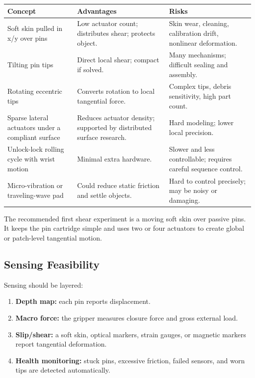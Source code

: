 \documentclass[11pt]{article}
\begin{document}
\begin{longtable}{L{0.22\textwidth} L{0.33\textwidth} L{0.33\textwidth}}
\toprule
\textbf{Concept} & \textbf{Advantages} & \textbf{Risks} \\
\midrule
\endhead
Soft skin pulled in x/y over pins & Low actuator count; distributes shear; protects object. & Skin wear, cleaning, calibration drift, nonlinear deformation. \\
Tilting pin tips & Direct local shear; compact if solved. & Many mechanisms; difficult sealing and assembly. \\
Rotating eccentric tips & Converts rotation to local tangential force. & Complex tips, debris sensitivity, high part count. \\
Sparse lateral actuators under a compliant surface & Reduces actuator density; supported by distributed surface research. & Hard modeling; lower local precision. \\
Unlock-lock rolling cycle with wrist motion & Minimal extra hardware. & Slower and less controllable; requires careful sequence control. \\
Micro-vibration or traveling-wave pad & Could reduce static friction and settle objects. & Hard to control precisely; may be noisy or damaging. \\
\bottomrule
\end{longtable}

The recommended first shear experiment is a moving soft skin over passive pins. It keeps the pin cartridge simple and uses two or four actuators to create global or patch-level tangential motion.

\subsection{Sensing Feasibility}

Sensing should be layered:

\begin{enumerate}[leftmargin=*]
  \item \textbf{Depth map:} each pin reports displacement.
  \item \textbf{Macro force:} the gripper measures closure force and gross external load.
  \item \textbf{Slip/shear:} a soft skin, optical markers, strain gauges, or magnetic markers report tangential deformation.
  \item \textbf{Health monitoring:} stuck pins, excessive friction, failed sensors, and worn tips are detected automatically.
\end{enumerate}
\end{document}
